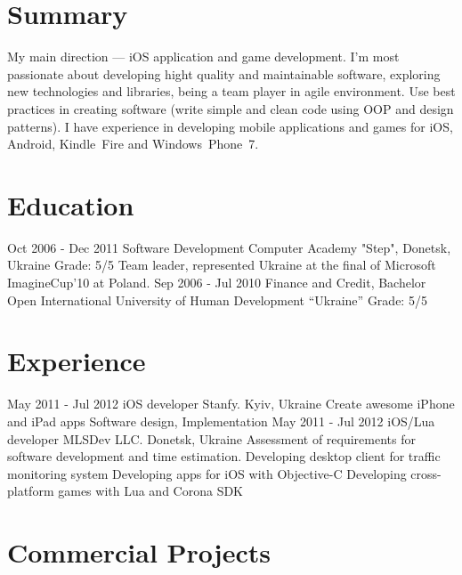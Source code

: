 \documentclass[11pt,a4paper]{moderncv}
\begin{document}
\maketitle

\section{Summary}
\cvline
  {}
  {My main direction --- iOS application and game development.\newline{}
  I'm most passionate about developing hight quality and maintainable software, exploring new technologies and libraries, being a team player in agile environment. Use best practices in creating software (write simple and clean code using OOP and design patterns). I have experience in developing mobile applications and games for iOS, Android, Kindle~Fire and Windows~Phone~7.{}}

\section{Education}
  \cventry
    {Oct 2006 - Dec 2011}
    {Software Development}
    {Computer Academy "Step", Donetsk, Ukraine}
    {Grade: 5/5}{}
    {Team leader, represented Ukraine at the final of Microsoft ImagineCup'10 at Poland.}
  \cventry
    {Sep 2006 - Jul 2010}
    {Finance and Credit, Bachelor}
    {\newline Open International University of Human Development “Ukraine”}
    {Grade: 5/5}{}{}

\section{Experience}
\cventry
  {May 2011 - Jul 2012}
  {iOS developer}
  {Stanfy. Kyiv, Ukraine}
  {}{}
  {Create awesome iPhone and iPad apps
  \newline Software design, Implementation}
\cventry
  {May 2011 - Jul 2012}
  {iOS/Lua developer}
  {MLSDev LLC. Donetsk, Ukraine}
  {}{}
  {Assessment of requirements for software development and time estimation. 
  \newline  Developing desktop client for traffic monitoring system
  \newline{}Developing apps for iOS with Objective-C
  \newline{}Developing cross-platform games with Lua and Corona SDK}

\section{Commercial Projects}
\end{document}
